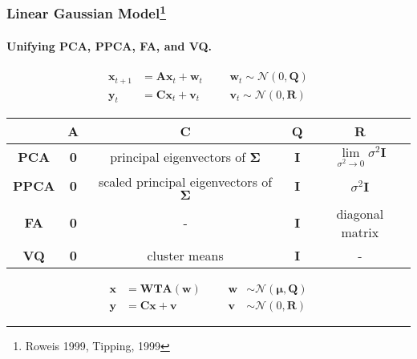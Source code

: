 





\begin{frame}[plain]
\frametitle{Linear Gaussian Model\footnote{Roweis 1999, Tipping, 1999}}
\framesubtitle{Unifying PCA, PPCA, FA, and VQ.}
\logoCSIPCPL\mypagenum

\begin{changemargin}{-1.3in}{0in}
\begin{equation}
\begin{array}{llllllllllllll}
\mathbf{x}_{t+1} &=  \mathbf{A}\mathbf{x}_{t} +  \mathbf{w}_t   & & & \mathbf{w}_t \sim \mathcal{N}(0, \mathbf{Q})\\
\mathbf{y}_t 		 &=  \mathbf{C}\mathbf{x}_{t} +  \mathbf{v}_t    & & & \mathbf{v}_t \sim \mathcal{N}(0, \mathbf{R})
\end{array}
\label{LGM}
\end{equation}
\small
\begin{table}[t]
\centering
\begin{tabular}{| c | c | c | c | c |}\hline
 				 	&\textbf{A}	 	&	\textbf{C}  									& \textbf{Q} 	&  \textbf{R}                                                                		\\\hline
\textbf{PCA} 	&\textbf{0}		&	principal eigenvectors of $\boldsymbol\Sigma$	& \textbf{I}  	&  $\lim\limits_{\sigma^2 \rightarrow 0} \sigma^2\mathbf{I}$ 	\\\hline
\textbf{PPCA} &\textbf{0}		& 	scaled principal eigenvectors of $\boldsymbol\Sigma$	& \textbf{I}	&										      $\sigma^2 \mathbf{I}$	 \\\hline
\textbf{FA}   	&\textbf{0}		&	-												& \textbf{I} 	&  diagonal matrix 																\\\hline
\textbf{VQ}	 	&\textbf{0} 	&	cluster means								& \textbf{I}	& 	-																					\\\hline
\end{tabular}
\label{table:LGM_unifying}
\end{table}
\begin{equation}
\begin{array}{llllllllllllll}
\mathbf{x} &= \mathbf{WTA}(\mathbf{w}) 						& & & \mathbf{w} &\sim \mathcal{N}(\mathbf{\boldsymbol\mu}, \mathbf{Q})\\
\mathbf{y} &=  \mathbf{C}\mathbf{x} +  \mathbf{v} 		& & & \mathbf{v} & \sim \mathcal{N}(0, \mathbf{R})
\end{array}
\label{LGM2}
\end{equation}
\end{changemargin}
\end{frame}




